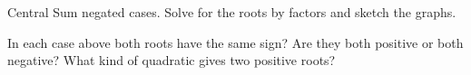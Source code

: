 \documentclass[12pt, a4paper, addpoints]{exam}
\begin{document}
\begin{questions}
\newpage


\question Central Sum negated cases. Solve for the roots by factors  and sketch the graphs. 
\setlength{\columnsep}{20pt}
\begin{multicols}{3}
\end{multicols}
\question In each case above both roots  have the same sign? Are they both positive or both negative? What kind of quadratic gives two positive roots?
\newpage


\end{questions}
\end{document}

